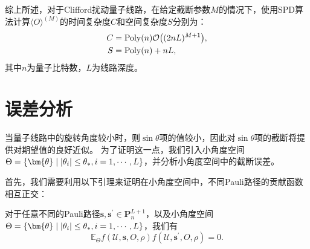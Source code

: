 综上所述，对于Clifford扰动量子线路，在给定截断参数$M$的情况下，使用SPD算法计算$\langle O \rangle ^{(M)}$的时间复杂度$C$和空间复杂度$S$分别为：
\begin{equation}\label{eq:cpc:cost}
    \begin{aligned}
        C&=\mathrm{Poly}(n) \order{(2nL)^{M+1}},\\
        S&=\mathrm{Poly}(n)+nL,
    \end{aligned}
\end{equation}
其中$n$为量子比特数，$L$为线路深度。

\section{误差分析}
当量子线路中的旋转角度较小时，则$\sin{\theta}$项的值较小，因此对$\sin{\theta}$项的截断将提供对期望值的良好近似。
为了证明这一点，我们引入小角度空间$\Theta=\{\bm{\theta}\mid \abs{\theta_i}\leq \theta_* ,i=1,\cdots,L \}$，并分析小角度空间中的截断误差。



首先，我们需要利用以下引理来证明在小角度空间中，不同Pauli路径的贡献函数相互正交：
\begin{lemma}
对于任意不同的Pauli路径$\bm{s},\bm{s}^{\prime}\in \bm{P}^{L+1}_n$，以及小角度空间$\Theta=\{\bm{\theta}\mid \abs{\theta_i}\leq \theta_* ,i=1,\cdots,L \}$，我们有
\begin{equation}\label{ap:eq:E_cross_equals_0}
\mathbb{E}_{\Theta}f(\mathcal{U},\bm{s},O,\rho)f(\mathcal{U},\bm{s}^{\prime},O,\rho)=0.
\end{equation}
\end{lemma}

